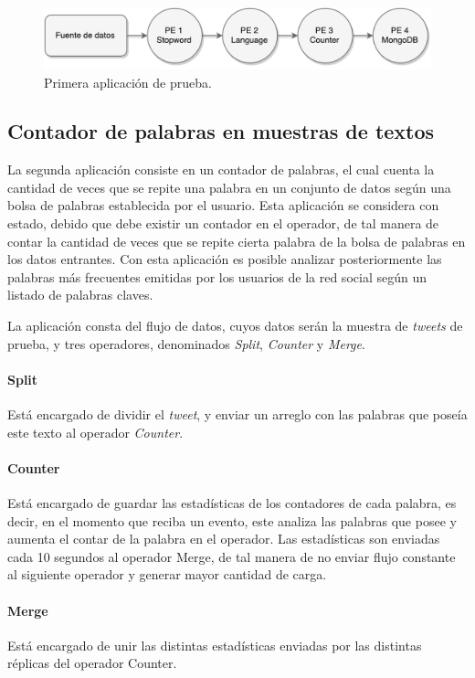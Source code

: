 \begin{figure}[!hb]
	\centering
		\includegraphics[scale=0.75]{images/App1.pdf}
	\caption{Primera aplicación de prueba.}
	\label{fig:primeraAplicacion}
\end{figure}

\subsection{Contador de palabras en muestras de textos}
La segunda aplicación consiste en un contador de palabras, el cual cuenta la cantidad de veces que se repite una palabra en un conjunto de datos según una bolsa de palabras establecida por el usuario. Esta aplicación se considera con estado, debido que debe existir un contador en el operador, de tal manera de contar la cantidad de veces que se repite cierta palabra de la bolsa de palabras en los datos entrantes. Con esta aplicación es posible analizar posteriormente las palabras más frecuentes emitidas por los usuarios de la red social según un listado de palabras claves.

La aplicación consta del flujo de datos, cuyos datos serán la muestra de \textit{tweets} de prueba, y tres operadores, denominados \textit{Split}, \textit{Counter} y \textit{Merge}.

\paragraph{Split} Está encargado de dividir el \textit{tweet}, y enviar un arreglo con las palabras que poseía este texto al operador \textit{Counter}.

\paragraph{Counter} Está encargado de guardar las estadísticas de los contadores de cada palabra, es decir, en el momento que reciba un evento, este analiza las palabras que posee y aumenta el contar de la palabra en el operador. Las estadísticas son enviadas cada 10 segundos al operador Merge, de tal manera de no enviar flujo constante al siguiente operador y generar mayor cantidad de carga.

\paragraph{Merge} Está encargado de unir las distintas estadísticas enviadas por las distintas réplicas del operador Counter.

